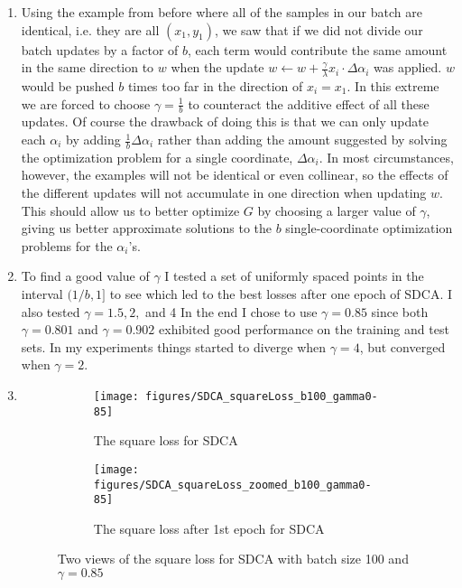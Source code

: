 \documentclass{article}
\begin{document}
\begin{enumerate}
	\item Using the example from before where all of the samples in our batch are identical, i.e. they are all $(x_1,y_1)$, we saw that if we did not divide our batch updates by a factor of $b$, each term would contribute the same amount in the same direction to $w$ when the update $w\leftarrow w+\tfrac\gamma\lambda x_i\cdot\Delta\alpha_i$ was applied. $w$ would be pushed $b$ times too far in the direction of $x_i=x_1$. In this extreme we are forced to choose $\gamma=\tfrac1b$ to counteract the additive effect of all these updates. Of course the drawback of doing this is that we can only update each $\alpha_i$ by adding $\tfrac1b\Delta\alpha_i$ rather than adding the amount suggested by solving the optimization problem for a single coordinate, $\Delta\alpha_i$. In most circumstances, however, the examples will not be identical or even collinear, so the effects of the different updates will not accumulate in one direction when updating $w$. This should allow us to better optimize $G$ by choosing a larger value of $\gamma$, giving us better approximate solutions to the $b$ single-coordinate optimization problems for the $\alpha_i$'s.

	\item To find a good value of $\gamma$ I tested a set of uniformly spaced points in the interval $(1/b,1]$ to see which led to the best losses after one epoch of SDCA. I also tested $\gamma=1.5,2,$ and 4 In the end I chose to use $\gamma=0.85$ since both $\gamma=0.801$ and $\gamma=0.902$ exhibited good performance on the training and test sets. In my experiments things started to diverge when $\gamma=4$, but converged when $\gamma=2$.

	\item

	\begin{figure}
		\centering
		\begin{subfigure}{0.49\textwidth}
			\centering
			\texttt{[image: figures/SDCA\_squareLoss\_b100\_gamma0-85]}
			\caption{The square loss for SDCA}
		\end{subfigure}
		\begin{subfigure}{0.49\textwidth}
			\centering
			\texttt{[image: figures/SDCA\_squareLoss\_zoomed\_b100\_gamma0-85]}
			\caption{The square loss after 1st epoch for SDCA}
		\end{subfigure}
		\caption{Two views of the square loss for SDCA with batch size 100 and $\gamma=0.85$} 
		\label{fig:SDCA_squareLoss_b100_gamma}
	\end{figure}


\end{enumerate}
\end{document}
